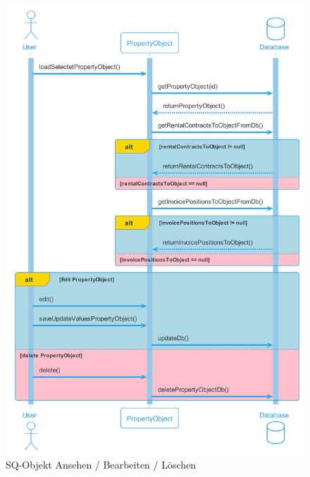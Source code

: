 \begin{figure}[H]
  \begin{center}
    \includegraphics[width=0.6\textheight]{content/diagrams/out/sequenzdiagram/objektAnsehenBearbeiten/objektAnsehenBearbeiten.png}
    \caption{SQ-Objekt Ansehen / Bearbeiten / Löschen}
  \end{center}
\end{figure}

